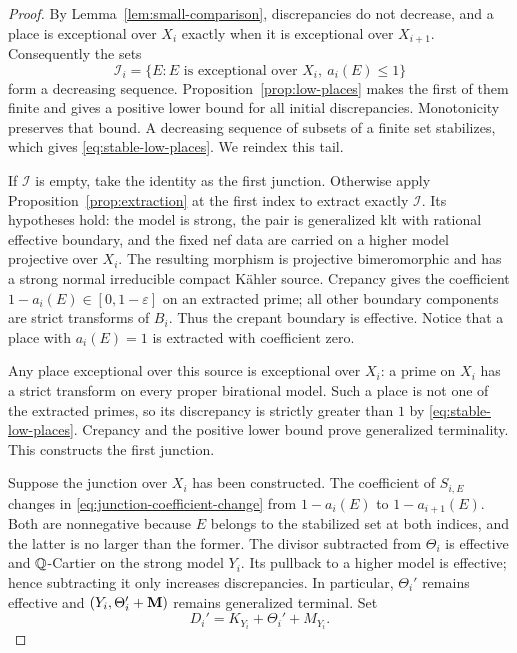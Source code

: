 \begin{proof}
By Lemma~\ref{lem:small-comparison}, discrepancies do not decrease, and a
place is exceptional over $X_i$ exactly when it is exceptional over
$X_{i+1}$.  Consequently the sets
\[
 \mathcal I_i=\{E:E\text{ is exceptional over }X_i,\ a_i(E)\leq1\}
\]
form a decreasing sequence.  Proposition~\ref{prop:low-places} makes the
first of them finite and gives a positive lower bound for all initial
discrepancies.  Monotonicity preserves that bound.  A decreasing sequence
of subsets of a finite set stabilizes, which gives
\eqref{eq:stable-low-places}.  We reindex this tail.

If $\mathcal I$ is empty, take the identity as the first junction.
Otherwise apply Proposition~\ref{prop:extraction} at the first index to
extract exactly $\mathcal I$.  Its hypotheses hold: the model is strong,
the pair is generalized klt with rational effective boundary, and the
fixed nef data are carried on a higher model projective over $X_i$.
The resulting morphism is projective bimeromorphic and has a strong normal
irreducible compact K\"ahler source.  Crepancy gives the coefficient
$1-a_i(E)\in[0,1-\varepsilon]$ on an extracted prime; all other boundary
components are strict transforms of $B_i$.  Thus the crepant boundary is
effective.  Notice that a place with $a_i(E)=1$ is extracted with coefficient
zero.

Any place exceptional over this source is exceptional over $X_i$: a prime
on $X_i$ has a strict transform on every proper birational model.  Such a
place is not one of the extracted primes, so its discrepancy is strictly
greater than $1$ by \eqref{eq:stable-low-places}.  Crepancy and the positive
lower bound prove generalized terminality.  This constructs the first
junction.

Suppose the junction over $X_i$ has been constructed.  The coefficient of
$S_{i,E}$ changes in \eqref{eq:junction-coefficient-change} from
$1-a_i(E)$ to $1-a_{i+1}(E)$.  Both are nonnegative because $E$ belongs to
the stabilized set at both indices, and the latter is no larger than the
former.  The divisor subtracted from $\Theta_i$ is effective and
$\mathbb{Q}$-Cartier on the strong model $Y_i$.  Its pullback to a higher model is
effective; hence subtracting it only increases discrepancies.  In
particular, $\Theta_i'$ remains effective and
$(Y_i,\Theta_i'+\mathbf{M})$ remains generalized terminal.  Set
\[
                    D_i'=K_{Y_i}+\Theta_i'+M_{Y_i}.
\]


\end{proof}
